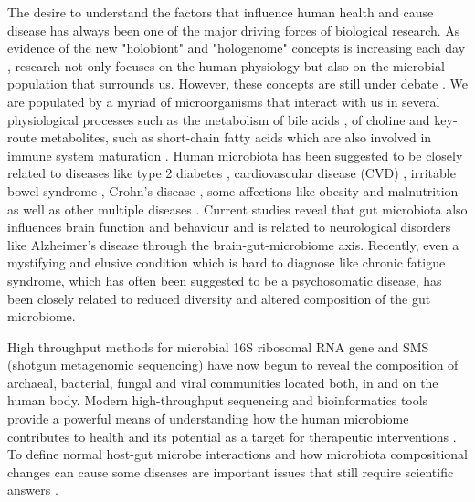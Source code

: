 The desire to understand the factors that influence human health and cause disease has always been one of the major driving forces of biological research. As evidence of the new "holobiont"  and "hologenome" concepts is increasing each day \cite{holo1, holo2}, research not only focuses on the human physiology but also on the microbial population that surrounds us. However, these concepts are still under debate \cite{holo3}. We are populated by a myriad of microorganisms that interact with us in several physiological processes such as the metabolism of bile acids \cite{bileacids}, of choline \cite{choline} and key-route metabolites, such as short-chain fatty acids \cite{scfa1, scfa2} which are also involved in immune system maturation \cite{scfa3, scfa4}. Human microbiota has been suggested to be closely related to diseases like type 2 diabetes \cite{diabetes2}, cardiovascular disease (CVD) \cite{CVD}, irritable bowel syndrome \cite{IBS}, Crohn's disease \cite{CD}, some affections like obesity \cite{ob1, ob2} and malnutrition \cite{nutr} as well as other multiple diseases \cite{Moya_trends}. Current studies reveal that gut microbiota also influences brain function and behaviour and is related to neurological disorders like Alzheimer's disease through the brain-gut-microbiome axis\cite{mind,AD}. Recently, even a mystifying and elusive condition which is hard to diagnose like chronic fatigue syndrome, which has often been suggested to be a psychosomatic disease, has been closely related to reduced diversity and altered composition of the gut microbiome\cite{CFS}. 

High throughput methods for microbial 16S ribosomal RNA gene and SMS (shotgun metagenomic sequencing) have now begun to reveal the composition of archaeal, bacterial, fungal and viral communities located both, in and on the human body. Modern high-throughput sequencing and bioinformatics tools provide a powerful means of understanding how the human microbiome contributes to health and its potential as a target for therapeutic interventions \cite{microb&health}. To define normal host-gut microbe interactions and how microbiota compositional changes can cause some diseases are important issues that still require scientific answers \cite{normal1, normal2, panthropology}.

